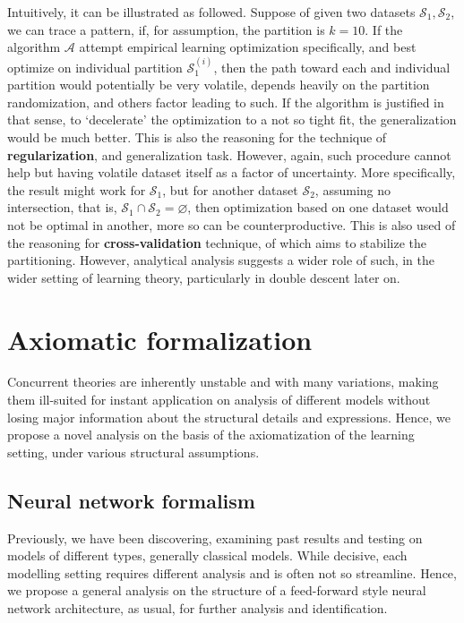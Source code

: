 \documentclass[10pt]{article} %
\begin{document}
Intuitively, it can be illustrated as followed. Suppose of given two datasets $\mathcal{S}_{1},\mathcal{S}_{2}$, we can trace a pattern, if, for assumption, the partition is $k=10$. If the algorithm $\mathcal{A}$ attempt empirical learning optimization specifically, and best optimize on individual partition $\mathcal{S}_{1}^{(i)}$, then the path toward each and individual partition would potentially be very volatile, depends heavily on the partition randomization, and others factor leading to such. If the algorithm is justified in that sense, to `decelerate' the optimization to a not so tight fit, the generalization would be much better. This is also the reasoning for the technique of \textbf{regularization}, and generalization task. However, again, such procedure cannot help but having volatile dataset itself as a factor of uncertainty. More specifically, the result might work for $\mathcal{S}_{1}$, but for another dataset $\mathcal{S}_{2}$, assuming no intersection, that is, $\mathcal{S}_{1}\cap \mathcal{S}_{2}=\varnothing$, then optimization based on one dataset would not be optimal in another, more so can be counterproductive. This is also used of the reasoning for \textbf{cross-validation} technique, of which aims to stabilize the partitioning. However, analytical analysis suggests a wider role of such, in the wider setting of learning theory, particularly in double descent later on. 

\clearpage

\section{Axiomatic formalization}

Concurrent theories are inherently unstable and with many variations, making them ill-suited for instant application on analysis of different models without losing major information about the structural details and expressions. Hence, we propose a novel analysis on the basis of the axiomatization of the learning setting, under various structural assumptions. 

\subsection{Neural network formalism}
Previously, we have been discovering, examining past results and testing on models of different types, generally classical models. While decisive, each modelling setting requires different analysis and is often not so streamline. Hence, we propose a general analysis on the structure of a feed-forward style neural network architecture, as usual, for further analysis and identification. 
\end{document}
